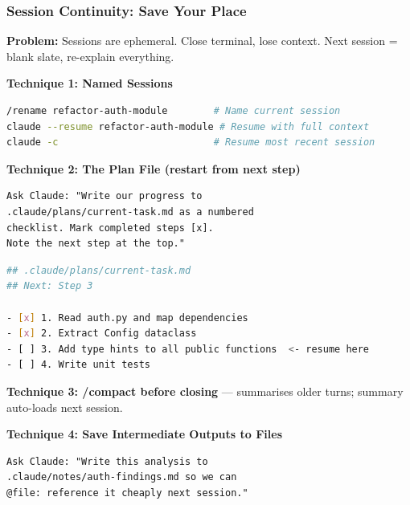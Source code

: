 \begin{frame}[fragile]\frametitle{Session Continuity: Save Your Place}
\textbf{Problem:} Sessions are ephemeral. Close terminal, lose context. Next session = blank slate, re-explain everything.

\textbf{Technique 1: Named Sessions}
\begin{lstlisting}[language=bash]
/rename refactor-auth-module        # Name current session
claude --resume refactor-auth-module # Resume with full context
claude -c                           # Resume most recent session
\end{lstlisting}

\textbf{Technique 2: The Plan File (restart from next step)}
\begin{lstlisting}
Ask Claude: "Write our progress to
.claude/plans/current-task.md as a numbered
checklist. Mark completed steps [x].
Note the next step at the top."
\end{lstlisting}
\begin{lstlisting}[language=bash]
## .claude/plans/current-task.md
## Next: Step 3

- [x] 1. Read auth.py and map dependencies
- [x] 2. Extract Config dataclass
- [ ] 3. Add type hints to all public functions  <- resume here
- [ ] 4. Write unit tests
\end{lstlisting}

\textbf{Technique 3: /compact before closing} --- summarises older turns; summary auto-loads next session.

\textbf{Technique 4: Save Intermediate Outputs to Files}
\begin{lstlisting}
Ask Claude: "Write this analysis to
.claude/notes/auth-findings.md so we can
@file: reference it cheaply next session."
\end{lstlisting}
\end{frame}


